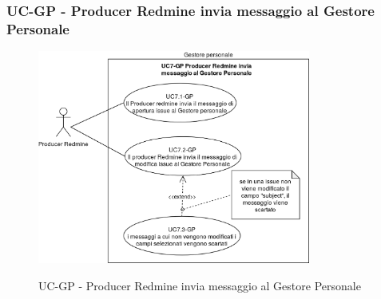 \subsubsection{UC\theuccount-GP - Producer Redmine invia messaggio al Gestore Personale}
    \begin{figure}[H]
		\centering
		\includegraphics[width=0.8\textwidth]{img/casi_d'uso/UC7.png}\\
		\caption{UC\theuccount-GP - Producer Redmine invia messaggio al Gestore Personale}
	\end{figure}
